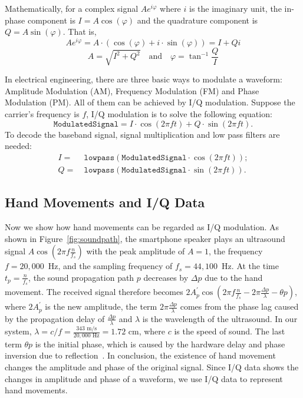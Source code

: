 Mathematically, for a complex signal $Ae^{i \varphi }$ where $i$ is the imaginary unit, the in-phase component is $I = A\cos(\varphi)$ and the quadrature component is $Q = A\sin(\varphi)$. That is,
\begin{displaymath}
	Ae^{i \varphi } = A \cdot (\cos(\varphi) + i \cdot \sin(\varphi)) = I + Qi
\end{displaymath}
\begin{displaymath}
 A = \sqrt{I^2 + Q^2} \quad \text{and} \quad \varphi = \tan^{-1}\frac{Q}{I}
\end{displaymath}


In electrical engineering, there are three basic ways to modulate a waveform: Amplitude Modulation (AM), Frequency Modulation (FM) and Phase Modulation (PM). All of them can be achieved by I/Q modulation. Suppose the carrier's frequency is $f$, I/Q modulation is to solve the following equation:
\begin{displaymath}
\texttt{ModulatedSignal} = I \cdot \cos(2 \pi f t) + Q \cdot \sin(2 \pi f t) .
\end{displaymath}
To decode the baseband signal, signal multiplication and low pass filters are needed:
\begin{align*}
I =~&\texttt{lowpass} (\texttt{ModulatedSignal} \cdot \cos(2 \pi f t) ) ;\\    
Q=~&\texttt{lowpass} (\texttt{ModulatedSignal} \cdot \sin(2 \pi f t) ) .
\end{align*}

\subsection{Hand Movements and I/Q Data}
Now we show how hand movements can be regarded as I/Q modulation. As shown in Figure~\ref{fig:soundpath}, the smartphone speaker plays an ultrasound signal $A\cos \left (2\pi f \frac{n}{f_s}\right)$ with the peak amplitude of $A=1$, the frequency $f = 20,000 $~Hz, and the sampling frequency of $f_s = 44,100 $~Hz. At the time $t_p = \frac{n}{f_s}$, the sound propagation path $p$ decreases by $\Delta p$ due to the hand movement. The received signal therefore becomes $2A^\prime_p \cos \left (2\pi f \frac{n}{f_s} - 2 \pi \frac{\Delta p}{\lambda} - \theta p\right)$, where $2A^\prime_p$ is the new amplitude, the term $2 \pi \frac{\Delta p}{\lambda}$ comes from the phase lag caused by the propagation delay of $\frac{\Delta p}{\lambda}$ and $\lambda$ is the wavelength of the ultrasound. In our system, $\lambda = c/f = \frac{343 \text{~m/s}}{20,000 \text{~Hz}} = 1.72 \text{~cm}$, where $c$ is the speed of sound. The last term $ \theta p$ is the initial phase, which is caused by the hardware delay and phase inversion due to reflection~\cite{wang2016device}. 
In conclusion, the existence of hand movement changes the amplitude and phase of the original signal. Since I/Q data shows the changes in amplitude and phase of a waveform, we use I/Q data to represent hand movements.

